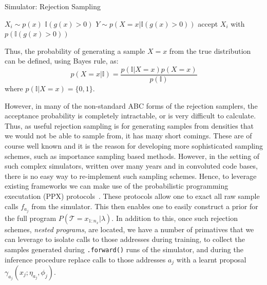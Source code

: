 \documentclass{article}
\begin{document}
\begin{algorithm}
  \small
   \caption{Simulator: Rejection Sampling}
   \label{alg:rssim}
    \begin{algorithmic}\small
       \State $X_{i} \sim p(x)$ 
       \State $\mathbb{I}(g(x) > 0)$
       \State $ Y \sim p(X=x | \mathbb{I}(g(x) > 0))$
       \State accept $X_i$ with $p(\mathbb{I}(g(x) > 0))$
\end{algorithmic}
\end{algorithm}
Thus, the probability of generating a sample $X = x$ from the true distribution can be defined, using Bayes rule, 
as: 
\begin{equation}
  p(X=x| \mathbb{I}) = \frac{p(\mathbb{I} | X=x)p(X=x)}{p(\mathbb{I})} 
\end{equation}
where $p(\mathbb{I} | X=x) = \{0,1\}$.

However, in many of the non-standard ABC forms of the rejection samplers, the acceptance 
probability is completely intractable, or is very difficult to calculate. 
Thus, as useful rejection sampling is for generating samples from densities that we 
would not be able to sample from, it has many short comings. 
These are of course well known and it is the reason for developing more sophisticated 
sampling schemes, such as importance sampling based methods.
However, in the setting of such complex simulators, written over many years and
in convoluted code bases, there is no easy way to re-implement such sampling 
schemes.
Hence, to leverage existing frameworks we can make use of the probabilistic 
programming executation (PPX) protocols~\cite{baydin2018efficient}. 
These protocols allow one to exact all raw sample calls $f_{a_j}$ from the
simulator. This then enables one to easily construct a prior for the full program
$P(\mathcal{T} = x_{1:n_{x}}| \lambda)$. 
In addition to this, once such rejection schemes, \emph{nested programs}, are located, we have a number of 
primatives that we can leverage to isolate calls to those addresses during training, to collect the samples generated during 
\texttt{.forward()} runs of the simulator, 
and during the inference procedure replace calls to those addresses $a_j$ with a
learnt proposal $\gamma_{a_j}(x_j ; \eta_{a_j}, \phi_j ) $. 

\end{document}
